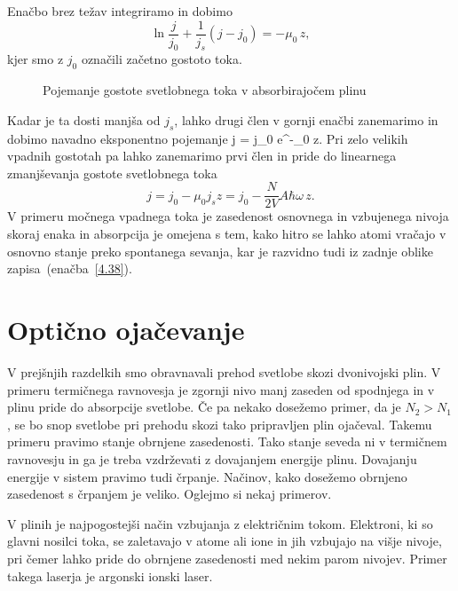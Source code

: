 Enačbo brez težav integriramo in dobimo 
\begin{equation}
\ln\frac{j}{j_{0}}+\frac{1}{j_{s}}(j-j_{0})=-\mu_{0}\, z,\label{4.37}
\end{equation}
kjer smo z $j_{0}$ označili začetno gostoto toka. 

\begin{figure}[h]
\centering
\def\svgwidth{90truemm} 

\caption{Pojemanje gostote svetlobnega toka v absorbirajočem plinu}
\label{fig:abs2}
\end{figure}

Kadar je ta dosti
manjša od $j_{s}$, lahko drugi člen v gornji enačbi zanemarimo in dobimo 
navadno eksponentno pojemanje
\beq
j = j_0 e^{-\mu_0 z}.
\eeq
Pri zelo velikih vpadnih gostotah pa lahko zanemarimo prvi člen  in pride do 
linearnega zmanjševanja gostote svetlobnega toka
\begin{equation}
j=j_{0}-\mu_{0}j_{s}z=j_{0}-\frac{N}{2V}A\hbar\omega\, z.
\label{4.38}
\end{equation}
V primeru močnega vpadnega toka je zasedenost osnovnega in vzbujenega nivoja skoraj
enaka in absorpcija je omejena s tem, kako hitro se lahko atomi vračajo
v osnovno stanje preko spontanega sevanja, kar je razvidno tudi iz
zadnje oblike zapisa~(enačba~\ref{4.38}).

\section{Optično ojačevanje}
V prejšnjih razdelkih smo obravnavali prehod svetlobe skozi dvonivojski plin. V primeru
termičnega ravnovesja je zgornji nivo manj zaseden od spodnjega in v plinu pride
do absorpcije svetlobe. Če pa nekako dosežemo primer, da je $N_{2}>N_{1}$, 
se bo snop svetlobe pri prehodu skozi tako pripravljen plin ojačeval. 
Takemu primeru pravimo stanje obrnjene zasedenosti. 
Tako stanje seveda ni v termičnem ravnovesju in ga je treba vzdrževati z dovajanjem 
energije plinu. Dovajanju energije v sistem pravimo tudi črpanje. 
Načinov, kako dosežemo obrnjeno zasedenost s črpanjem je veliko. Oglejmo 
si nekaj primerov. 

V plinih je najpogostejši način vzbujanja z električnim tokom. Elektroni,
ki so glavni nosilci toka, se zaletavajo v atome ali ione in jih vzbujajo
na višje nivoje, pri čemer lahko pride do obrnjene zasedenosti med
nekim parom nivojev. Primer takega laserja je argonski ionski laser. 

